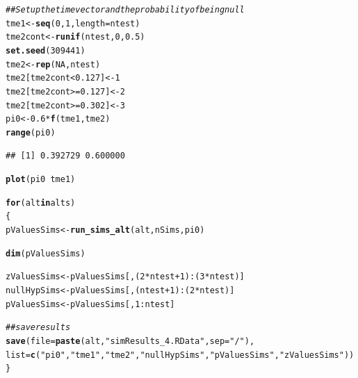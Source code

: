 \documentclass{article}\usepackage[]{graphicx}\usepackage[]{color}
\makeatletter
\newcommand{\hlnum}[1]{\textcolor[rgb]{0.686,0.059,0.569}{#1}}%
\newcommand{\hlstr}[1]{\textcolor[rgb]{0.192,0.494,0.8}{#1}}%
\newcommand{\hlcom}[1]{\textcolor[rgb]{0.678,0.584,0.686}{\textit{#1}}}%
\newcommand{\hlopt}[1]{\textcolor[rgb]{0,0,0}{#1}}%
\newcommand{\hlstd}[1]{\textcolor[rgb]{0.345,0.345,0.345}{#1}}%
\newcommand{\hlkwa}[1]{\textcolor[rgb]{0.161,0.373,0.58}{\textbf{#1}}}%
\newcommand{\hlkwb}[1]{\textcolor[rgb]{0.69,0.353,0.396}{#1}}%
\newcommand{\hlkwc}[1]{\textcolor[rgb]{0.333,0.667,0.333}{#1}}%
\newcommand{\hlkwd}[1]{\textcolor[rgb]{0.737,0.353,0.396}{\textbf{#1}}}%
\newenvironment{kframe}{%
 \def\at@end@of@kframe{}%
 \ifinner\ifhmode%
  \def\at@end@of@kframe{\end{minipage}}%
  \begin{minipage}{\columnwidth}%
 \fi\fi%
 \def\FrameCommand##1{\hskip\@totalleftmargin \hskip-\fboxsep
 \colorbox{shadecolor}{##1}\hskip-\fboxsep
     \hskip-\linewidth \hskip-\@totalleftmargin \hskip\columnwidth}%
 \MakeFramed {\advance\hsize-\width
   \@totalleftmargin\z@ \linewidth\hsize
   \@setminipage}}%
 {\par\unskip\endMakeFramed%
 \at@end@of@kframe}
\newenvironment{knitrout}{}{} %
\makeatother
\begin{document}
\begin{knitrout}
\color{fgcolor}\begin{kframe}
\begin{alltt}
\hlcom{## Set up the time vector and the probability of being null}
\hlstd{tme1} \hlkwb{<-} \hlkwd{seq}\hlstd{(}\hlnum{0}\hlstd{,}\hlnum{1}\hlstd{,}\hlkwc{length}\hlstd{=ntest)}
\hlstd{tme2cont} \hlkwb{<-} \hlkwd{runif}\hlstd{(ntest,}\hlnum{0}\hlstd{,}\hlnum{0.5}\hlstd{)}
\hlkwd{set.seed}\hlstd{(}\hlnum{309441}\hlstd{)}
\hlstd{tme2} \hlkwb{<-} \hlkwd{rep}\hlstd{(}\hlnum{NA}\hlstd{, ntest)}
\hlstd{tme2[tme2cont} \hlopt{<} \hlnum{0.127}\hlstd{]} \hlkwb{<-} \hlnum{1}
\hlstd{tme2[tme2cont} \hlopt{>=} \hlnum{0.127}\hlstd{]} \hlkwb{<-} \hlnum{2}
\hlstd{tme2[tme2cont} \hlopt{>=} \hlnum{0.302}\hlstd{]} \hlkwb{<-} \hlnum{3}
\hlstd{pi0} \hlkwb{<-} \hlnum{0.6}\hlopt{*}\hlkwd{f}\hlstd{(tme1, tme2)}
\hlkwd{range}\hlstd{(pi0)}
\end{alltt}
\begin{verbatim}
## [1] 0.392729 0.600000
\end{verbatim}
\begin{alltt}
\hlkwd{plot}\hlstd{(pi0} \hlopt{~} \hlstd{tme1)}

\hlkwa{for}\hlstd{(alt} \hlkwa{in} \hlstd{alts)}
\hlstd{\{}
  \hlstd{pValuesSims} \hlkwb{<-} \hlkwd{run_sims_alt}\hlstd{(alt, nSims, pi0)}

  \hlkwd{dim}\hlstd{(pValuesSims)}

  \hlstd{zValuesSims} \hlkwb{<-} \hlstd{pValuesSims[,(}\hlnum{2}\hlopt{*}\hlstd{ntest}\hlopt{+}\hlnum{1}\hlstd{)}\hlopt{:}\hlstd{(}\hlnum{3}\hlopt{*}\hlstd{ntest)]}
  \hlstd{nullHypSims} \hlkwb{<-} \hlstd{pValuesSims[,(ntest}\hlopt{+}\hlnum{1}\hlstd{)}\hlopt{:}\hlstd{(}\hlnum{2}\hlopt{*}\hlstd{ntest)]}
  \hlstd{pValuesSims} \hlkwb{<-} \hlstd{pValuesSims[,}\hlnum{1}\hlopt{:}\hlstd{ntest]}

  \hlcom{##save results}
  \hlkwd{save}\hlstd{(}\hlkwc{file}\hlstd{=}\hlkwd{paste}\hlstd{(alt,} \hlstr{"simResults_4.RData"}\hlstd{,}\hlkwc{sep}\hlstd{=}\hlstr{"/"}\hlstd{),}
       \hlkwc{list}\hlstd{=}\hlkwd{c}\hlstd{(}\hlstr{"pi0"}\hlstd{,} \hlstr{"tme1"}\hlstd{,} \hlstr{"tme2"}\hlstd{,} \hlstr{"nullHypSims"}\hlstd{,}\hlstr{"pValuesSims"}\hlstd{,}\hlstr{"zValuesSims"}\hlstd{))}
\hlstd{\}}
\end{alltt}
\end{kframe}


\end{knitrout}
\end{document}
